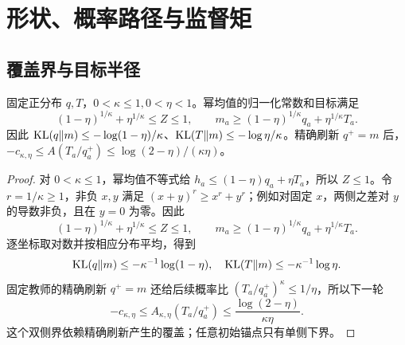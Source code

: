 \chapter{形状、概率路径与监督矩}
\label{app:shape}
\section{覆盖界与目标半径}
\begin{theorem}[正形状的覆盖与刷新后信号范围]
固定正分布 $q,T$，$0<\kappa\le1,0<\eta<1$。幂均值的归一化常数和目标满足
\begin{equation}
(1-\eta)^{1/\kappa}+\eta^{1/\kappa}\le Z\le1,\qquad
m_a\ge(1-\eta)^{1/\kappa}q_a+\eta^{1/\kappa}T_a.
\end{equation}
因此 $\operatorname{KL}(q\Vert m)\le-\log(1-\eta)/\kappa$、$\operatorname{KL}(T\Vert m)\le-\log\eta/\kappa$。精确刷新 $q^+=m$ 后，
$-c_{\kappa,\eta}\le A(T_a/q_a^+)\le\log(2-\eta)/(\kappa\eta)$。
\end{theorem}
\begin{proof}
对 $0<\kappa\le1$，幂均值不等式给 $h_a\le(1-\eta)q_a+\eta T_a$，所以 $Z\le1$。令 $r=1/\kappa\ge1$，非负 $x,y$ 满足 $(x+y)^r\ge x^r+y^r$；例如对固定 $x$，两侧之差对 $y$ 的导数非负，且在 $y=0$ 为零。因此
\begin{equation}
(1-\eta)^{1/\kappa}+\eta^{1/\kappa}\le Z\le1,\qquad
m_a\ge(1-\eta)^{1/\kappa}q_a+\eta^{1/\kappa}T_a.
\end{equation}
逐坐标取对数并按相应分布平均，得到
\begin{equation}
\operatorname{KL}(q\Vert m)\le-\kappa^{-1}\log(1-\eta),\quad
\operatorname{KL}(T\Vert m)\le-\kappa^{-1}\log\eta.
\end{equation}
固定教师的精确刷新 $q^+=m$ 还给后续概率比 $(T_a/q_a^+)^\kappa\le1/\eta$，所以下一轮
\begin{equation}
-c_{\kappa,\eta}\le A_{\kappa,\eta}(T_a/q_a^+)
\le\frac{\log(2-\eta)}{\kappa\eta}.
\end{equation}
这个双侧界依赖精确刷新产生的覆盖；任意初始锚点只有单侧下界。
\end{proof}

